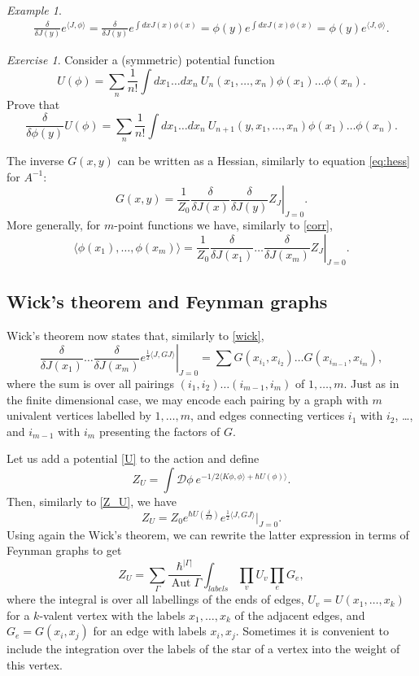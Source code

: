 \documentclass[10pt]{amsart}
\theoremstyle{definition}
\theoremstyle{remark}
\newtheorem{ex}[thm]{Example}
\newtheorem{exs}[thm]{Exercise}
\def\<{\langle}
\def\>{\rangle}
\newcommand{\h}{\hbar}
\newcommand{\cD}{\mathcal{D}}
\newcommand{\Gd}{\delta}
\newcommand{\GG}{\Gamma}
\newcommand{\Aut}{\operatorname{Aut}}
\begin{document}
\begin{ex}
\begin{multline*}
\frac{\Gd}{\Gd J(y)}e^{\<J,\phi\>}=\frac{\Gd}{\Gd J(y)} e^{\int dx
J(x)\phi(x)}=\phi(y)e^{\int dx J(x)\phi(x)} =\phi(y)
e^{\<J,\phi\>} .
\end{multline*}
\end{ex}
\begin{exs}
Consider a (symmetric) potential function
\begin{equation}
\label{U} U(\phi)=\sum_n\frac1{n!}\int dx_1\dots dx_n\
U_n(x_1,\dots,x_n) \phi(x_1)\dots\phi(x_n).
\end{equation}
Prove that
$$
   \frac{\Gd}{\Gd\phi(y)}U(\phi)=\sum_n\frac1{n!}\int dx_1\dots dx_n\
         U_{n+1}(y,x_1,\dots,x_n)\phi(x_1)\dots\phi(x_n).
$$
\end{exs}
%
The inverse $G(x,y)$ can be written as a Hessian, similarly to
equation \eqref{eq:hess} for $A^{-1}$:
$$
   G(x,y)=\left. \frac1{Z_0}\frac{\Gd}{\Gd J(x)}\frac{\Gd}{\Gd J(y)}Z_J\right|_{J=0}.
$$
 More generally, for $m$-point functions we have, similarly to \eqref{corr},
$$
  \left.   \<\phi(x_1),\dots,\phi(x_m)\>=\frac1{Z_0}\frac{\Gd}{\Gd J(x_1)}
            \dots\frac{\Gd}{\Gd J(x_m)}Z_J \right|_{J=0}.
$$

\subsection{Wick's theorem and Feynman graphs}
Wick's theorem now states that, similarly to \eqref{wick},
$$
   \left. \frac{\Gd}{\Gd J(x_1)}\dots\frac{\Gd}{\Gd J(x_m)}e^{\frac12\<J,GJ\>}
    \right|_{J=0}=\sum G(x_{i_1},x_{i_2})\dots G(x_{i_{m-1}},x_{i_m}),
$$
where the sum is over all pairings $(i_1,i_2)\dots(i_{m-1},i_m)$
of $1,\dots,m$. Just as in the finite dimensional case, we may
encode each pairing by a graph with $m$ univalent vertices
labelled by $1,\dots,m$, and edges connecting vertices $i_1$ with
$i_2$, \dots, and $i_{m-1}$ with $i_m$ presenting the factors of
$G$.

Let us add a potential \eqref{U} to the action and define
$$
    Z_U=\int \cD\phi\ e^{-1/2\<K\phi,\phi\>+\h U(\phi)\>}.
$$
Then, similarly to \eqref{Z_U}, we have
$$
        Z_U=Z_0 e^{\h U(\frac{\Gd}{\Gd J})}e^{\frac12\<J,GJ\>}\big|_{J=0}.
$$
Using again the Wick's theorem, we can rewrite the latter
expression in terms of Feynman graphs to get
\begin{equation}\label{graphs}
Z_U=\sum_{\GG}\frac{\h^{|\GG|}}{\Aut\GG}\int_{labels}\prod_vU_v\prod_e G_e ,
\end{equation}
where the integral is over all labellings of the ends of edges,
$U_v=U(x_1,\dots,x_k)$ for a $k$-valent vertex with the labels
$x_1,\dots,x_k$ of the adjacent edges, and $G_e=G(x_i,x_j)$ for an
edge with labels $x_i,x_j$. Sometimes it is convenient to include
the integration over the labels of the star of a vertex into the
weight of this vertex.
\end{document}
